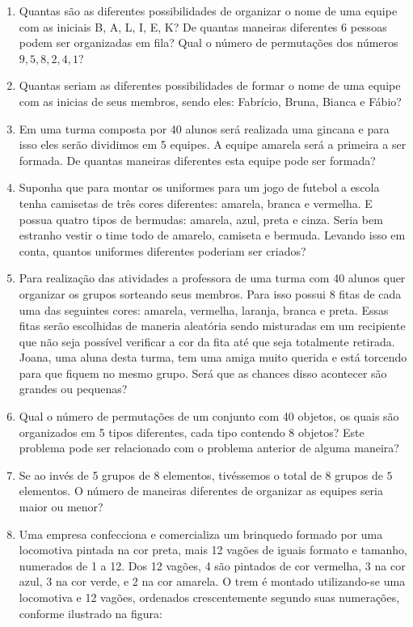 \begin{enumerate}
\item  Quantas são as diferentes possibilidades de organizar o nome de uma equipe com as iniciais B, A, L, I, E, K? De quantas maneiras diferentes 6 pessoas podem ser organizadas em fila? Qual o número de permutações dos números $9, 5, 8, 2, 4, 1?$

\item Quantas seriam as diferentes possibilidades de formar o nome de uma equipe com as inicias de seus membros, sendo eles: Fabrício, Bruna, Bianca e Fábio? 

\item Em uma turma composta por 40 alunos será realizada uma gincana e para isso eles serão dividimos em 5 equipes. A equipe amarela será a primeira a ser formada. De quantas maneiras diferentes esta equipe pode ser formada?

\item Suponha que para montar os uniformes para um jogo de futebol a escola tenha camisetas de três cores diferentes: amarela, branca e vermelha. E possua quatro tipos de bermudas: amarela, azul, preta e cinza. Seria bem estranho vestir o time todo de amarelo, camiseta e bermuda. Levando isso em conta, quantos uniformes diferentes poderiam ser criados?

\item Para realização das atividades a professora de uma turma com 40 alunos quer organizar os grupos sorteando seus membros. Para isso possui 8 fitas de cada uma das seguintes cores: amarela, vermelha, laranja, branca e preta. Essas fitas serão escolhidas de maneria aleatória sendo misturadas em um recipiente que não seja possível verificar a cor da fita até que seja totalmente retirada.  Joana, uma aluna desta turma, tem uma amiga muito querida e está torcendo para que fiquem no mesmo grupo. Será que as chances disso acontecer são grandes ou pequenas?

\item Qual o número de permutações de um conjunto com 40 objetos, os quais são organizados em 5 tipos diferentes, cada tipo contendo 8 objetos? Este problema pode ser relacionado com o problema anterior de alguma maneira?

\item Se ao invés de 5 grupos de $8$ elementos, tivéssemos o total de 8 grupos de $5$ elementos. O número de maneiras diferentes de organizar as equipes seria maior ou menor? 

\item Uma empresa confecciona e comercializa um brinquedo formado por uma locomotiva pintada na cor preta, mais 12 vagões de iguais formato e tamanho, numerados de 1 a 12. Dos 12 vagões, 4 são pintados de cor vermelha, 3 na cor azul, 3 na cor verde, e 2 na cor amarela. O trem é montado utilizando-se uma locomotiva e 12 vagões, ordenados crescentemente segundo suas numerações, conforme ilustrado na figura: 


\end{enumerate}

